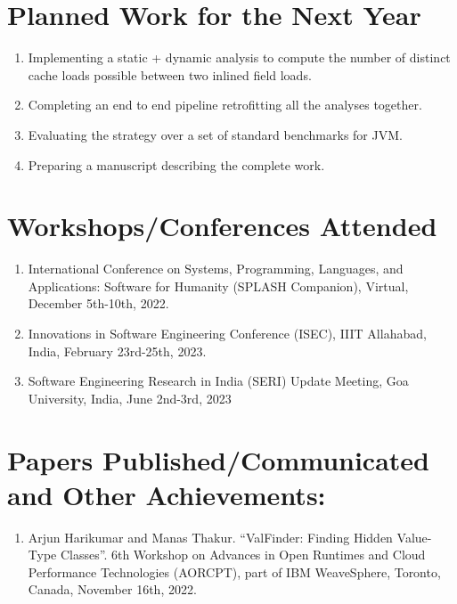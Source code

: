 \documentclass[12 pt, a4paper]{article}
\begin{document}
\section{Planned Work for the Next Year}   
 \begin{enumerate}
\item Implementing a static + dynamic analysis to compute the number of distinct
		cache loads possible between two inlined field loads.

\item Completing an end to end pipeline retrofitting all the analyses together.

\item Evaluating the strategy over a set of standard benchmarks for JVM.

\item Preparing a manuscript describing the complete work.
 
\end{enumerate} 





\vskip 0.7cm
\section{Workshops/Conferences Attended}
\begin{enumerate}
\item International Conference on Systems, Programming, 
Languages, and Applications: Software for Humanity 
(SPLASH Companion), Virtual, December 5th-10th, 2022.
\item {} Innovations in Software Engineering Conference (ISEC), 
IIIT Allahabad, India, February 23rd-25th, 2023.
\item Software Engineering Research in India (SERI) Update Meeting, 
Goa University, India, June 2nd-3rd, 2023
\end{enumerate} 



\section{Papers Published/Communicated and Other Achievements:} 
\begin{enumerate}
\item Arjun Harikumar and Manas Thakur. “ValFinder: Finding Hidden Value-Type Classes”. 
6th Workshop on Advances in Open Runtimes and Cloud Performance Technologies (AORCPT), part of IBM WeaveSphere, Toronto, Canada, November 16th, 2022.
\end{enumerate} 
\end{document}
